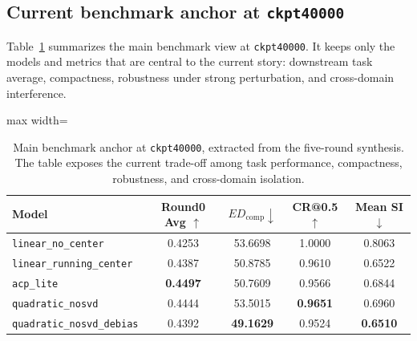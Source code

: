 \documentclass[11pt]{article}
\newcommand{\tablesize}{\footnotesize}
\begin{document}
\subsection{Current benchmark anchor at \texttt{ckpt40000}}

Table~\ref{tab:benchmark-40000} summarizes the main benchmark view at \texttt{ckpt40000}. It keeps only the models and metrics that are central to the current story: downstream task average, compactness, robustness under strong perturbation, and cross-domain interference.

\begin{table}[H]
\centering
\tablesize
\begin{adjustbox}{max width=\linewidth}
\begin{tabular}{lcccc}
\toprule
Model & Round0 Avg $\uparrow$ & $ED_{\mathrm{comp}} \downarrow$ & CR@0.5 $\uparrow$ & Mean SI $\downarrow$ \\
\midrule
\texttt{linear\_no\_center} & 0.4253 & 53.6698 & 1.0000 & 0.8063 \\
\texttt{linear\_running\_center} & 0.4387 & 50.8785 & 0.9610 & 0.6522 \\
\texttt{acp\_lite} & \textbf{0.4497} & 50.7609 & 0.9566 & 0.6844 \\
\texttt{quadratic\_nosvd} & 0.4444 & 53.5015 & \textbf{0.9651} & 0.6960 \\
\texttt{quadratic\_nosvd\_debias} & 0.4392 & \textbf{49.1629} & 0.9524 & \textbf{0.6510} \\
\bottomrule
\end{tabular}
\end{adjustbox}
\caption{Main benchmark anchor at \texttt{ckpt40000}, extracted from the five-round synthesis. The table exposes the current trade-off among task performance, compactness, robustness, and cross-domain isolation.}
\label{tab:benchmark-40000}
\end{table}
\end{document}
